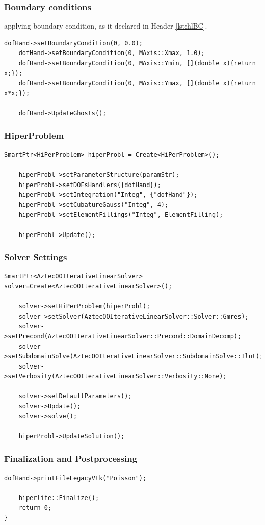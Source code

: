 \documentclass[]{article}
\begin{document}
\subsubsection{Boundary conditions} \label{sec: BC}
applying boundary condition, as it declared in Header \ref{lst:hlBC}.
\begin{lstlisting}[firstnumber=59]
	dofHand->setBoundaryCondition(0, 0.0); 
	dofHand->setBoundaryCondition(0, MAxis::Xmax, 1.0);
	dofHand->setBoundaryCondition(0, MAxis::Ymin, [](double x){return x;});
	dofHand->setBoundaryCondition(0, MAxis::Ymax, [](double x){return x*x;});
	
	dofHand->UpdateGhosts();
\end{lstlisting}

\subsubsection{HiperProblem} \label{sec: hpc}
\begin{lstlisting}[firstnumber=65]
	SmartPtr<HiPerProblem> hiperProbl = Create<HiPerProblem>();
	
	hiperProbl->setParameterStructure(paramStr);
	hiperProbl->setDOFsHandlers({dofHand});
	hiperProbl->setIntegration("Integ", {"dofHand"});
	hiperProbl->setCubatureGauss("Integ", 4);
	hiperProbl->setElementFillings("Integ", ElementFilling);
	
	hiperProbl->Update();
\end{lstlisting}

\subsubsection{Solver Settings} \label{sec: slv}
\begin{lstlisting}[firstnumber=74]
	SmartPtr<AztecOOIterativeLinearSolver> solver=Create<AztecOOIterativeLinearSolver>();
	
	solver->setHiPerProblem(hiperProbl);
	solver->setSolver(AztecOOIterativeLinearSolver::Solver::Gmres);
	solver->setPrecond(AztecOOIterativeLinearSolver::Precond::DomainDecomp);
	solver->setSubdomainSolve(AztecOOIterativeLinearSolver::SubdomainSolve::Ilut);
	solver->setVerbosity(AztecOOIterativeLinearSolver::Verbosity::None);
	
	solver->setDefaultParameters();
	solver->Update();
	solver->solve();
	
	hiperProbl->UpdateSolution();
\end{lstlisting}

\subsubsection{Finalization and Postprocessing} \label{sec: fnl}
\begin{lstlisting}[firstnumber=87]
	dofHand->printFileLegacyVtk("Poisson");
		
	hiperlife::Finalize();
	return 0;
}
\end{lstlisting}
\end{document}
